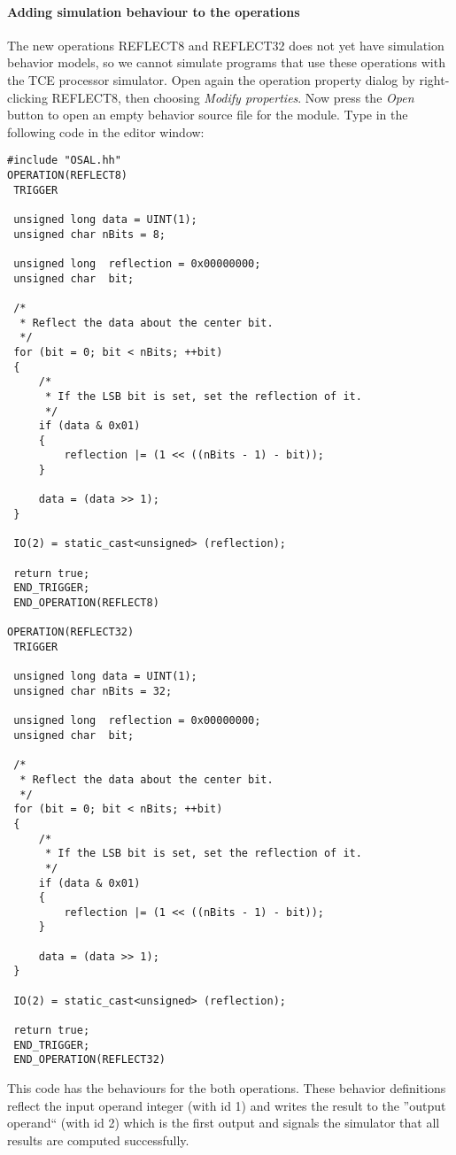 \documentclass[twoside]{tceusermanual}
\begin{document}
\paragraph{Adding simulation behaviour to the operations} The new operations
REFLECT8 and REFLECT32 does not yet have simulation behavior models, so we
cannot simulate programs that use these operations with the TCE processor
simulator. Open again the operation property dialog by right-clicking REFLECT8,
then choosing \emph{Modify properties}. Now press the \emph{Open} button to
open an empty behavior source file for the module. Type in the following code
in the editor window:

\begin{verbatim}
#include "OSAL.hh"
OPERATION(REFLECT8)
 TRIGGER

 unsigned long data = UINT(1);
 unsigned char nBits = 8;

 unsigned long  reflection = 0x00000000;
 unsigned char  bit;

 /*
  * Reflect the data about the center bit.
  */
 for (bit = 0; bit < nBits; ++bit)
 {
     /*
      * If the LSB bit is set, set the reflection of it.
      */
     if (data & 0x01)
     {
         reflection |= (1 << ((nBits - 1) - bit));
     }

     data = (data >> 1);
 }

 IO(2) = static_cast<unsigned> (reflection);

 return true;
 END_TRIGGER;
 END_OPERATION(REFLECT8)

OPERATION(REFLECT32)
 TRIGGER

 unsigned long data = UINT(1);
 unsigned char nBits = 32;

 unsigned long  reflection = 0x00000000;
 unsigned char  bit;

 /*
  * Reflect the data about the center bit.
  */
 for (bit = 0; bit < nBits; ++bit)
 {
     /*
      * If the LSB bit is set, set the reflection of it.
      */
     if (data & 0x01)
     {
         reflection |= (1 << ((nBits - 1) - bit));
     }

     data = (data >> 1);
 }

 IO(2) = static_cast<unsigned> (reflection);

 return true;
 END_TRIGGER;
 END_OPERATION(REFLECT32)
\end{verbatim}

This code has the behaviours for the both operations. These behavior definitions
reflect the input operand integer (with id 1) and writes the result to the
''output operand`` (with id 2) which is the first output and signals the simulator
that all results are computed successfully.
\end{document}
